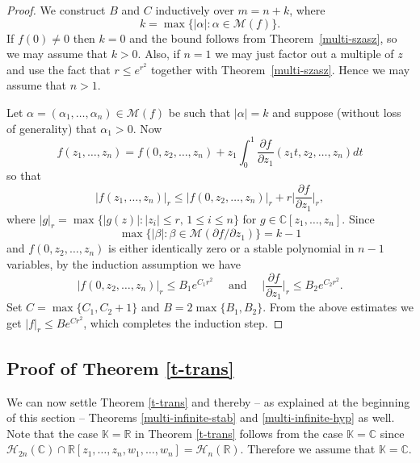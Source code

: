\documentclass[10pt,reqno]{amsart}
\theoremstyle{plain}
\theoremstyle{definition}
\theoremstyle{remark}
\numberwithin{equation}{section}
\newcommand{\HH}{\mathcal{H}}
\newcommand{\MM}{\mathcal{M}}
\newcommand{\RR}{\mathbb{R}}
\newcommand{\CC}{\mathbb{C}}
\newcommand{\KK}{\mathbb{K}}
\begin{document}
\begin{proof}
We construct $B$ and $C$ inductively over $m=n+k$, where 
$$
k=\max\{|\alpha| : \alpha \in \MM(f)\}.
$$  
If $f(0) \neq 0$ then $k=0$ and the bound follows from 
Theorem~\ref{multi-szasz}, so we may assume that $k>0$. 
Also, if $n=1$ we may just factor out a multiple of $z$ and use the fact 
that $r \leq e^{r^2}$ together with Theorem~\ref{multi-szasz}.  
Hence we may assume that $n>1$. 

Let $\alpha=(\alpha_1,\ldots,\alpha_n)\in
\MM(f)$ be such that $|\alpha|=k$ and suppose (without loss of generality)
that $\alpha_1>0$. Now 
$$
f(z_1,\ldots, z_n) = f(0,z_2,\ldots, z_n)
+ z_1\int_0^1 \frac {\partial f}{\partial z_1}(z_1t, z_2, \ldots, z_n) dt
$$
so that  
$$
|f(z_1,\ldots, z_n)|_r \leq |f(0,z_2,\ldots,z_n)|_r 
+ r \Big|\frac {\partial f}{\partial z_1}\Big|_r,
$$
where $|g|_r = \max \Big\{ |g(z)| : |z_i| \leq r,\, 1\leq i \leq n\Big\}$ for
$g\in\CC[z_1,\ldots, z_n]$. Since 
$$\max\{|\beta| : \beta\in \MM(\partial f/\partial z_1)\}= k-1$$
and $f(0,z_2,\ldots,z_n)$ is either identically zero or a stable polynomial 
in $n-1$ variables, by the induction assumption we have 
$$
|f(0,z_2,\ldots,z_n)|_r \leq B_1e^{C_1r^2} \quad \mbox{ and } \quad  
\Big|\frac {\partial f}{\partial z_1}\Big|_r \leq B_2e^{C_2r^2}.
$$
Set $C=\max\{C_1, C_2+1\}$ and $B=2\max\{B_1, B_2\}$. 
From the above estimates we get 
$|f|_r \leq  B e^{Cr^2}$, which completes the induction step. 
\end{proof}

\subsection{Proof of Theorem \ref{t-trans}}\label{ss-83}

We can now settle Theorem \ref{t-trans} and thereby -- as explained at the
beginning of this section -- Theorems \ref{multi-infinite-stab} and 
\ref{multi-infinite-hyp} as well. Note that the case $\KK=\RR$ in Theorem \ref{t-trans} follows from the case $\KK=\CC$ since $\HH_{2n}(\CC) \cap \RR[z_1,\ldots, z_n, w_1,\ldots, w_n]= \HH_n(\RR)$. Therefore we assume that $\KK=\CC$. 
\end{document}
